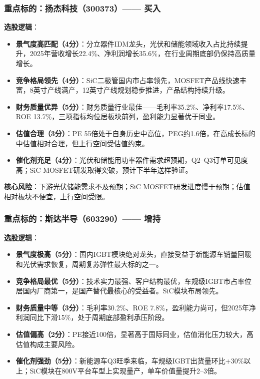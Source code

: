 \subsubsection*{重点标的：扬杰科技（300373）—— 买入}

\textbf{选股逻辑}：
\vspace{0.2em}
\begin{itemize}[leftmargin=2em]
\item \textbf{景气度高匹配（4分）}：分立器件IDM龙头，光伏和储能领域收入占比持续提升，2025年营收增长22.4\%、净利润增长35.6\%，在行业周期底部仍保持高质量增长。
\item \textbf{竞争格局领先（4分）}：SiC二极管国内市占率领先，MOSFET产品线快速丰富，8英寸产线满产，12英寸产线规划稳步推进，产品结构持续升级。
\item \textbf{财务质量优异（5分）}：财务质量行业最佳——毛利率35.2\%、净利率17.5\%、ROE 13.7\%，三项指标均位居板块前列，盈利能力显著优于同业。
\item \textbf{估值合理（3分）}：PE 55倍处于自身历史中高位，PEG约1.6倍，在高成长标的中估值相对合理，但上行空间受估值约束。
\item \textbf{催化剂充足（4分）}：光伏和储能用功率器件需求超预期，Q2--Q3订单可见度高；SiC MOSFET研发取得突破，预计下半年送样验证。
\end{itemize}

\textbf{核心风险}：下游光伏储能需求不及预期；SiC MOSFET研发进度慢于预期；估值相对板块不便宜，上行空间受限。

\subsubsection*{重点标的：斯达半导（603290）—— 增持}

\textbf{选股逻辑}：
\vspace{0.2em}
\begin{itemize}[leftmargin=2em]
\item \textbf{景气度极高（5分）}：国内IGBT模块绝对龙头，直接受益于新能源车销量回暖和光伏需求恢复，周期复苏弹性最大标的之一。
\item \textbf{竞争格局最优（5分）}：技术实力最强、客户结构最优，车规级IGBT市占率位居国内厂商第一，是国产替代最核心的受益者。SiC模块布局领先。
\item \textbf{财务质量中等（3分）}：毛利率30.2\%、ROE 7.8\%，盈利能力尚可，但2025年净利润同比下滑15\%，处于周期底部盈利承压阶段。
\item \textbf{估值偏高（2分）}：PE接近100倍，显著高于国际同业，估值消化压力较大，高估值构成主要风险。
\item \textbf{催化剂强劲（5分）}：新能源车Q3旺季来临，车规级IGBT出货量环比+30\%以上；SiC模块在800V平台车型上实现量产，单车价值量提升2--3倍。
\end{itemize}


